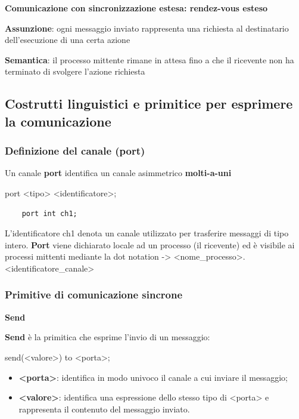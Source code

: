 \documentclass{article}
\begin{document}
\vspace{5mm}
\textbf{Comunicazione con sincronizzazione estesa: rendez-vous esteso}

\textbf{Assunzione}: ogni messaggio inviato rappresenta una richiesta al destinatario dell'esecuzione di una certa azione

\textbf{Semantica}: il processo mittente rimane in attesa fino a che il ricevente non ha terminato di svolgere l'azione richiesta


\subsection{Costrutti linguistici e primitice per esprimere la comunicazione}
\subsubsection{Definizione del canale (port)}

Un canale \textbf{port} identifica un canale asimmetrico \textbf{molti-a-uni}

port <tipo> <identificatore>;

\begin{lstlisting}
    port int ch1;
\end{lstlisting}

L'identificatore ch1 denota un canale utilizzato per trasferire messaggi di tipo intero. \textbf{Port} viene dichiarato locale ad un processo (il ricevente) ed è visibile ai
processi mittenti mediante la dot notation -> <nome_processo>.<identificatore_canale>

\subsubsection{Primitive di comunicazione sincrone}

\textbf{Send}
\vspace{3mm}

\textbf{Send} è la primitica che esprime l'invio di un messaggio:
\begin{center}
    send(<valore>) to <porta>;
\end{center}

\begin{itemize}
    \item \textbf{<porta>}: identifica in modo univoco il canale a cui inviare il messaggio;
    \item \textbf{<valore>}: identifica una espressione dello stesso tipo di <porta> e rappresenta il contenuto del messaggio inviato.
\end{itemize}
\end{document}
